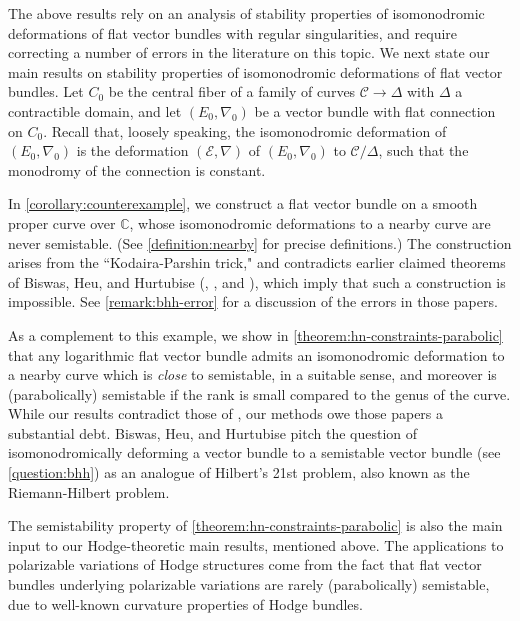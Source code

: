 \documentclass[12 pt]{amsart}
\theoremstyle{plain}
\theoremstyle{definition}
\theoremstyle{remark}
\numberwithin{equation}{section}
\begin{document}
The above results rely on an analysis of stability properties of isomonodromic deformations of flat vector bundles with regular singularities, and require correcting a number of errors in the literature on this topic.
We next state our main results on stability properties of isomonodromic
deformations of flat vector bundles.
Let $C_0$ be the central fiber of a family of curves $\mathscr{C}\to \Delta$
with $\Delta$ a contractible domain, and let $(E_0, \nabla_0)$ be a vector
bundle with flat connection
on $C_0$. Recall that, loosely speaking, the isomonodromic deformation of $(E_0, \nabla_0)$  is the deformation $(\mathscr{E}, \nabla)$  of $(E_0, \nabla_0)$ to $\mathscr{C}/\Delta$, such that the monodromy of the connection is constant.

In \autoref{corollary:counterexample}, we construct a flat vector bundle on a smooth proper curve over $\mathbb{C}$, whose isomonodromic deformations 
to a nearby curve
are never semistable. 
(See \autoref{definition:nearby} for precise definitions.)
The construction arises from the ``Kodaira-Parshin trick," and contradicts  earlier claimed theorems of Biswas, Heu, and Hurtubise (\cite[Theorem 1.3]{BHH:logarithmic},
\cite[Theorem 1.3]{BHH:irregular}, and
\cite[Theorem 1.2]{BHH:parabolic}), which imply that such a construction is impossible. See \autoref{remark:bhh-error} for a discussion of the errors in those papers. 

As a complement to this example, we show in
\autoref{theorem:hn-constraints-parabolic} that any logarithmic flat vector
bundle admits an isomonodromic deformation to a nearby curve which is \emph{close} to semistable,
in a suitable sense,
and moreover is (parabolically) semistable if the rank is small compared to the genus of the curve.
While our results contradict those of \cite{BHH:logarithmic, BHH:irregular,
BHH:parabolic}, our methods owe those papers a substantial debt. 
Biswas, Heu,
and Hurtubise 
pitch the question of isomonodromically deforming a vector bundle to a
semistable vector bundle (see \autoref{question:bhh})
as an
analogue of Hilbert's 21st problem, also known as the Riemann-Hilbert problem.

The semistability property of \autoref{theorem:hn-constraints-parabolic} is also the main
input to our Hodge-theoretic main results, mentioned above.
The applications to polarizable variations of Hodge structures come from the fact that flat vector bundles underlying polarizable variations are rarely (parabolically) semistable, due to well-known curvature properties of Hodge bundles.
\end{document}
